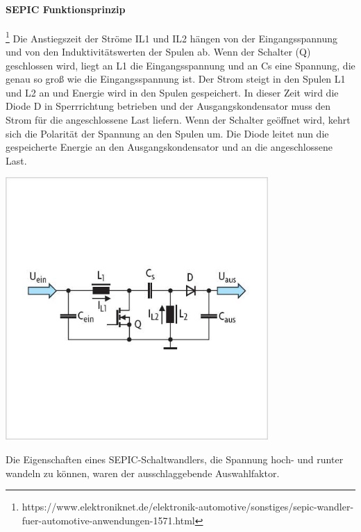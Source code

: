 \documentclass[paper=a4, 12pt]{scrreprt}
\begin{document}
	\paragraph{SEPIC Funktionsprinzip}\footnote{https://www.elektroniknet.de/elektronik-automotive/sonstiges/sepic-wandler-fuer-automotive-anwendungen-1571.html}\hfill \break
	Die Anstiegszeit der Ströme IL1 und IL2 hängen von der Eingangsspannung und von den Induktivitätswerten der Spulen ab. Wenn der Schalter (Q) geschlossen wird, liegt an L1 die Eingangsspannung und an Cs eine Spannung, die genau so groß wie die Eingangsspannung ist. Der Strom steigt in den Spulen L1 und L2 an und Energie wird in den Spulen gespeichert. In dieser Zeit wird die Diode D in Sperrrichtung betrieben und der Ausgangskondensator muss den Strom für die angeschlossene Last liefern. Wenn der Schalter geöffnet wird, kehrt sich die Polarität der Spannung an den Spulen um. Die Diode leitet nun die gespeicherte Energie an den Ausgangskondensator und an die angeschlossene Last.
	\begin{adjustbox}{center,caption={Prinzipschaltung eines SEPIC-Converters},label={fig:SEPIC-Prinzipschaltung},nofloat=figure,vspace=\bigskipamount}
		\includegraphics[height=10cm]{img/SEPIC_PRinzipschaltung.jpg}
	\hfill \break
	\end{adjustbox}
	Die Eigenschaften eines SEPIC-Schaltwandlers, die Spannung hoch- und runter wandeln zu können, waren der ausschlaggebende Auswahlfaktor.
	\pagebreak
\end{document}
